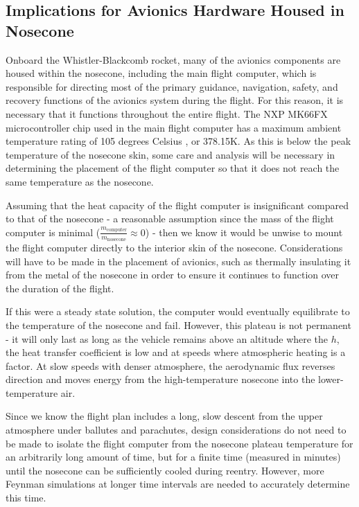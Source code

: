 \documentclass[twocolumn]{article}
\begin{document}
            \subsection{Implications for Avionics Hardware Housed in Nosecone}
            Onboard the Whistler-Blackcomb rocket, many of the avionics components
            are housed within the nosecone, including the main flight computer, which
            is responsible for directing most of the primary guidance, navigation, safety, 
            and recovery functions of the avionics system during the flight. For 
            this reason, it is necessary that it functions throughout the entire
            flight. The NXP MK66FX microcontroller chip used in the main flight 
            computer has a maximum ambient temperature rating of 105 degrees Celsius 
            \cite{NXP:K66}, or 378.15K. As this is below the peak temperature
            of the nosecone skin, some care and analysis will be necessary in 
            determining the placement of the flight computer so that it does not 
            reach the same temperature as the nosecone.

            Assuming that the heat capacity of the flight computer is insignificant 
            compared to that of the nosecone - a reasonable assumption since the 
            mass of the flight computer is minimal 
            ($\frac{m_{\textrm{computer}}}{m_\textrm{nosecone}}\approx 0$) - then 
            we know it would be unwise to mount the flight computer directly to
            the interior skin of the nosecone. Considerations will have to be
            made in the placement of avionics, such as thermally insulating it from 
            the metal of the nosecone in order to ensure it continues to function over the duration of 
            the flight. 
            
            If this were a steady state solution, the computer would 
            eventually equilibrate to the temperature of the nosecone and fail.
            However, this plateau is not permanent - it will only last as long as 
            the vehicle remains above an altitude where the $h$, the heat transfer 
            coefficient is low and at speeds where atmospheric heating is a factor.
            At slow speeds with denser atmosphere, the aerodynamic flux reverses
            direction and moves energy from the high-temperature nosecone into the 
            lower-temperature air. 
            
            Since we know the flight plan includes a long,
            slow descent from the upper atmosphere under ballutes and parachutes, 
            design considerations do not need to be made to isolate the flight computer
            from the nosecone plateau temperature for an arbitrarily long amount of time, 
            but for a finite time (measured in minutes) until the nosecone can 
            be sufficiently cooled during reentry. However, more Feynman simulations
            at longer time intervals are needed to accurately determine this time. 
\end{document}
